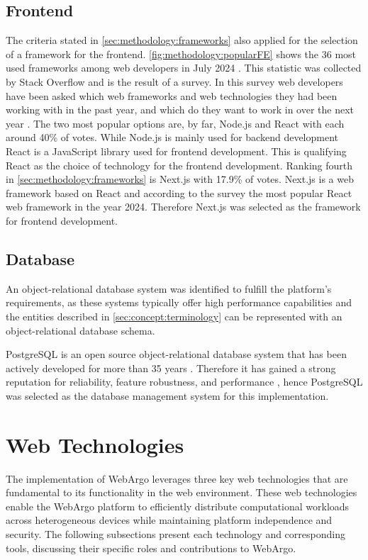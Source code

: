 \subsection{Frontend}
\label{subsec:methodology:frameworks:frontend}
The criteria stated in \autoref{sec:methodology:frameworks} also applied for the selection of a framework for the frontend. \autoref{fig:methodology:popularFE} shows the 36 most used frameworks among web developers in July 2024 \cite{frontend:popularity}. This statistic was collected by Stack Overflow and is the result of a survey. In this survey web developers have been asked which web frameworks and web technologies they had been working with in the past year, and which do they want to work in over the next year \cite{frontend:popularity}. The two most popular options are, by far, Node.js and React with each around 40\% of votes. While Node.js is mainly used for backend development React is a JavaScript library used for frontend development. This is qualifying React as the choice of technology for the frontend development. Ranking fourth in \autoref{sec:methodology:frameworks} is Next.js with 17.9\% of votes. Next.js is a web framework based on React \cite{methodology:nextjs} and according to the survey the most popular React web framework in the year 2024. Therefore Next.js was selected as the framework for frontend development.

\subsection{Database}
An object-relational database system was identified to fulfill the platform's requirements, as these systems typically offer high performance capabilities and the entities described in \autoref{sec:concept:terminology} can be represented with an object-relational database schema.

PostgreSQL is an open source object-relational database system that has been actively developed for more than 35 years \cite{methodology:db}. Therefore it has gained a strong reputation for reliability, feature robustness, and performance \cite{methodology:db}, hence PostgreSQL was selected as the database management system for this implementation.

\section{Web Technologies}
The implementation of WebArgo leverages three key web technologies that are fundamental to its functionality in the web environment. These web technologies enable the WebArgo platform to efficiently distribute computational workloads across heterogeneous devices while maintaining platform independence and security. The following subsections present each technology and corresponding tools, discussing their specific roles and contributions to WebArgo.

